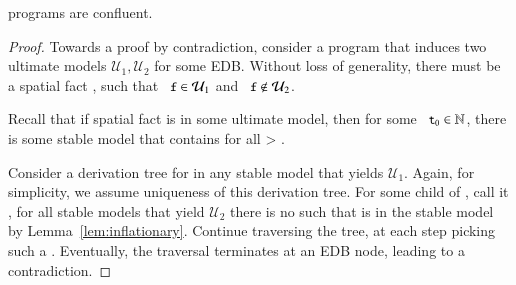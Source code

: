 \begin{theorem}
\label{thm:confluence}
\slang programs are confluent.
\end{theorem}
\begin{proof}

Towards a proof by contradiction, consider a \slang program that 
induces two ultimate models $\mathcal{U}_1, \mathcal{U}_2$ for some EDB.  Without loss of generality, there must be a spatial fact , such that 
$\dedalus{f} \in \mathcal{U}_1$ and $\dedalus{f} \not\in \mathcal{U}_2$.

Recall that if spatial fact  is in some ultimate model, then for some $\dedalus{t\sub{0}} \in \mathbb{N}$, there is some stable model that contains  for all  > .

Consider a derivation tree for  in any stable model that yields $\mathcal{U}_1$.  Again, for simplicity, we assume uniqueness of this derivation tree.  For some child of , call it , for all stable models that yield $\mathcal{U}_2$ there is no  such that  is in the stable model by Lemma~\ref{lem:inflationary}.  Continue traversing the tree, at each step picking such a .  Eventually, the traversal terminates at an EDB node, leading to a contradiction.
\end{proof}


